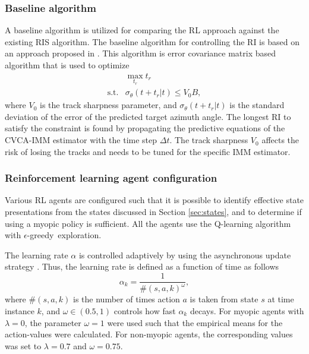 \documentclass[english, 12pt, a4paper, elec, utf8, a-1b, online]{aaltothesis}
\newcommand{\egreedy}{$\epsilon$-greedy~}
\newcommand{\dt}{\Delta t}
\newcommand{\ri}{t_r}
\begin{document}
\subsubsection{Baseline algorithm} \label{sec:baseline_algorithm}

A baseline algorithm is utilized for comparing the RL approach against the existing RIS algorithm.
The baseline algorithm for controlling the RI is based on an approach proposed in \cite{Daeipour1994}.
This algorithm is error covariance matrix based algorithm that is used to optimize
\begin{equation}\label{eq:baseline_ineq}
    \begin{array}{ll}
         & \max_{t_r} t_r \\
        \text{s.t.} & \sigma_\theta(t+\ri|t) \leq V_0 B, 
    \end{array}
\end{equation}
where $V_0$ is the track sharpness parameter, and $\sigma_\theta(t+\ri|t)$ is the standard deviation of the error of the predicted target azimuth angle.
The longest RI to satisfy the constraint is found by propagating the predictive equations of the CVCA-IMM estimator with the time step $\dt$.
The track sharpness $V_0$ affects the risk of losing the tracks and needs to be tuned for the specific IMM estimator.

\subsubsection{Reinforcement learning agent configuration}\label{sec:RL_config}

Various RL agents are configured such that it is possible to identify effective state presentations from the states discussed in Section \ref{sec:states}, and to determine if using a myopic policy is sufficient.
All the agents use the Q-learning algorithm with \egreedy exploration.

The learning rate $\alpha$ is controlled adaptively by using the asynchronous update strategy \cite{Even-Dar2003}.
Thus, the learning rate is defined as a function of time as follows
\begin{equation}
    \alpha_k = \frac{1}{\#(s, a, k)^\omega},
\end{equation}
where $\#(s, a, k)$ is the number of times action $a$ is taken from state $s$ at time instance $k$, and $\omega \in (0.5, 1)$ controls how fast $\alpha_k$ decays.
For myopic agents with $\lambda=0$, the parameter $\omega=1$ were used such that the empirical means for the action-values were calculated.
For non-myopic agents, the corresponding values was set to $\lambda=0.7$ and $\omega=0.75$. 
\end{document}
